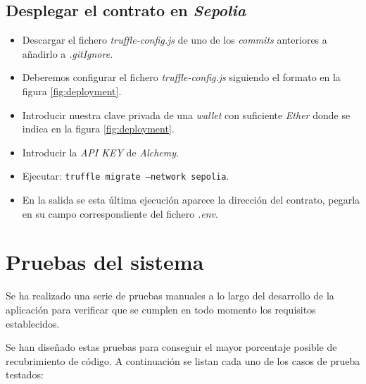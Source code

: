 \subsection{Desplegar el contrato en \textit{Sepolia}}
\begin{itemize}
    \item Descargar el  fichero \textit{truffle-config.js} de uno de los \textit{commits} anteriores a añadirlo a \textit{.gitIgnore}.
    \item Deberemos configurar el fichero \textit{truffle-config.js} siguiendo el formato en la figura \ref{fig:deployment}.
    \item Introducir nuestra clave privada de una \textit{wallet} con suficiente \textit{Ether} donde se indica en la figura \ref{fig:deployment}.
    \item Introducir la \textit{API KEY} de \textit{Alchemy}.
    \item Ejecutar: \texttt{truffle migrate --network sepolia}.
    \item En la salida se esta última ejecución aparece la dirección del contrato, pegarla en su campo correspondiente del fichero \textit{.env}.
\end{itemize}


\section{Pruebas del sistema}
Se ha realizado una serie de pruebas manuales a lo largo del desarrollo de la aplicación para verificar que se cumplen en todo momento los requisitos establecidos.

Se han diseñado estas pruebas para conseguir el mayor porcentaje posible de recubrimiento de código. A continuación se listan cada uno de los casos de prueba testados:


